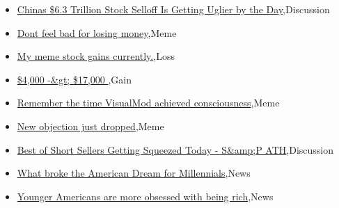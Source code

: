 \documentclass{article}%
\begin{document}
%
\begin{itemize}%
\item%
\href{https://reddit.com/r/wallstreetbets/comments/19b8ydk/chinas\_63\_trillion\_stock\_selloff\_is\_getting/}{Chinas \$6.3 Trillion Stock Selloff Is Getting Uglier by the Day},Discussion%
\item%
\href{https://reddit.com/r/wallstreetbets/comments/19b7m9s/dont\_feel\_bad\_for\_losing\_money/}{Dont feel bad for losing money},Meme%
\item%
\href{https://reddit.com/r/wallstreetbets/comments/19b5jpy/my\_meme\_stock\_gains\_currently/}{My meme stock gains currently.},Loss%
\item%
\href{https://reddit.com/r/wallstreetbets/comments/19b3axv/4000\_17000/}{\$4,000 -\&gt; \$17,000 },Gain%
\item%
\href{https://reddit.com/r/wallstreetbets/comments/19b34zj/remember\_the\_time\_visualmod\_achieved\_consciousness/}{Remember the time VisualMod achieved consciousness},Meme%
\item%
\href{https://reddit.com/r/StockMarket/comments/19aum5t/new\_objection\_just\_dropped/}{New objection just dropped},Meme%
\item%
\href{https://reddit.com/r/StockMarket/comments/19aqbtj/best\_of\_short\_sellers\_getting\_squeezed\_today\_sp/}{Best of Short Sellers Getting Squeezed Today - S\&amp;P ATH},Discussion%
\item%
\href{https://reddit.com/r/Economics/comments/19b2gbn/what\_broke\_the\_american\_dream\_for\_millennials/}{What broke the American Dream for Millennials},News%
\item%
\href{https://reddit.com/r/Economics/comments/19axhba/younger\_americans\_are\_more\_obsessed\_with\_being/}{Younger Americans are more obsessed with being rich},News%
\end{itemize}%
\end{document}
